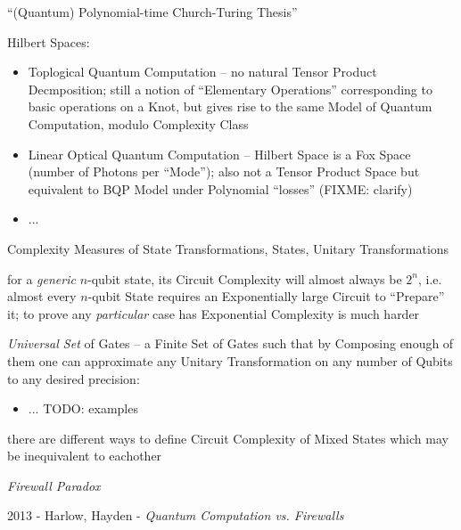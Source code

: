 ``(Quantum) Polynomial-time Church-Turing Thesis''

Hilbert Spaces:
\begin{itemize}
  \item Toplogical Quantum Computation -- no natural Tensor Product
    Decmposition; still a notion of ``Elementary Operations'' corresponding to
    basic operations on a Knot, but gives rise to the same Model of Quantum
    Computation, modulo Complexity Class
  \item Linear Optical Quantum Computation -- Hilbert Space is a Fox Space
    (number of Photons per ``Mode''); also not a Tensor Product Space but
    equivalent to BQP Model under Polynomial ``losses'' (FIXME: clarify)
  \item ...
\end{itemize}

Complexity Measures of State Transformations, States, Unitary Transformations

for a \emph{generic} $n$-qubit state, its Circuit Complexity will almost always
be $2^n$, i.e. almost every $n$-qubit State requires an Exponentially large
Circuit to ``Prepare'' it; to prove any \emph{particular} case has Exponential
Complexity is much harder

\emph{Universal Set} of Gates -- a Finite Set of Gates such that by Composing
enough of them one can approximate any Unitary Transformation on any number of
Qubits to any desired precision:
\begin{itemize}
  \item ... TODO: examples
\end{itemize}

there are different ways to define Circuit Complexity of Mixed States which may
be inequivalent to eachother

\emph{Firewall Paradox}

2013 - Harlow, Hayden - \emph{Quantum Computation vs. Firewalls}

